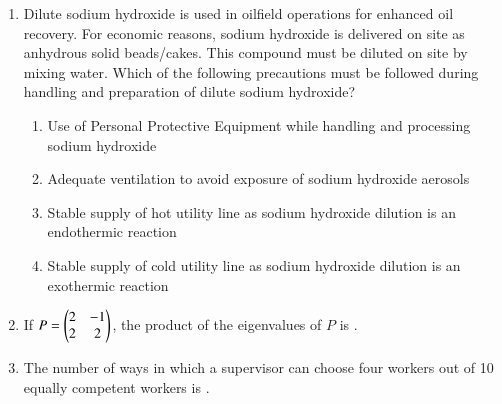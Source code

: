 \documentclass[journal,12pt,onecolumn]{IEEEtran}
\theoremstyle{remark}
\begin{document}
\begin{enumerate}
\item Dilute sodium hydroxide is used in oilfield operations for enhanced oil recovery. For economic reasons, sodium hydroxide is delivered on site as anhydrous solid beads/cakes. This compound must be diluted on site by mixing water. Which of the following precautions must be followed during handling and preparation of dilute sodium hydroxide?
\begin{enumerate}
    \item Use of Personal Protective Equipment  while handling and processing sodium hydroxide
    \item Adequate ventilation to avoid exposure of sodium hydroxide aerosols
    \item Stable supply of hot utility line as sodium hydroxide dilution is an endothermic reaction
    \item Stable supply of cold utility line as sodium hydroxide dilution is an exothermic reaction
\end{enumerate}
\hfill{}
\item  If $P = \begin{pmatrix} 2 & -1 \\ 2 & 2 \end{pmatrix}$, the product of the eigenvalues of $P$ is \underline{\hspace{1cm}}.
\begin{enumerate}
\end{enumerate}
\hfill{}



\item  The number of ways in which a supervisor can choose four workers out of 10 equally competent workers is \underline{\hspace{1cm}}.
\begin{enumerate}
\end{enumerate}
\hfill{}




\end{enumerate}
\end{document}
